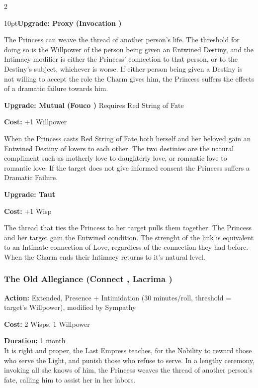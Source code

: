 \begin{multicols}{2}
\begin{myindentpar}{10pt}\textbf{Upgrade: Proxy (Invocation \textbullet\textbullet\textbullet\textbullet)}

The Princess can weave the thread of another person's life. The threshold for doing so is the Willpower of the person being given an Entwined Destiny, and the Intimacy modifier is either the Princess' connection to that person, or to the Destiny's subject, whichever is worse. If either person being given a Destiny is not willing to accept the role the Charm gives him, the Princess suffers the effects of a dramatic failure towards him.

\textbf{Upgrade: Mutual (Fouco \textbullet\textbullet\textbullet\textbullet)}
\noindent Requires Red String of Fate

\noindent \textbf{Cost:} +1 Willpower

When the Princess casts Red String of Fate both herself and her beloved gain an Entwined Destiny of lovers to each other. The two destinies are the natural compliment such as motherly love to daughterly love, or romantic love to romantic love. If the target does not give informed consent the Princess suffers a Dramatic Failure.

\textbf{Upgrade: Taut}

\noindent \textbf{Cost:} +1 Wisp

The thread that ties the Princess to her target pulls them together. The Princess and her target gain the Entwined condition. The strenght of the link is equivalent to an Intimate connection of Love, regardless of the connection they had before. When the Charm ends their Intimacy returns to it's natural level.
\end{myindentpar}


\subsubsection*{The Old Allegiance (Connect \textbullet\textbullet\textbullet\textbullet, Lacrima \textbullet\textbullet\textbullet)}

\noindent \textbf{Action:} Extended, Presence + Intimidation (30 minutes/roll, threshold = target's Willpower), modified by Sympathy

\noindent \textbf{Cost:} 2 Wisps, 1 Willpower

\noindent \textbf{Duration:} 1 month\\

\noindent It is right and proper, the Last Empress teaches, for the Nobility to reward those who serve the Light, and punish those who refuse to serve. In a lengthy ceremony, invoking all she knows of him, the Princess weaves the thread of another person's fate, calling him to assist her in her labors.


\end{multicols}
